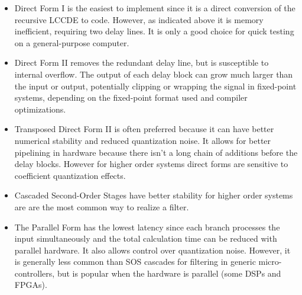 \documentclass{article}
\begin{document}
\begin{itemize}
\item Direct Form I is the easiest to implement since it is a direct conversion of the recursive LCCDE to code. However, as indicated above it is memory inefficient, requiring two delay lines. It is only a good choice for quick testing on a general-purpose computer.
\item Direct Form II removes the redundant delay line, but is susceptible to internal overflow. The output of each delay block can grow much larger than the input or output, potentially clipping or wrapping the signal in fixed-point systems, depending on the fixed-point format used and compiler optimizations.
\item Transposed Direct Form II is often preferred because it can have better numerical stability and reduced quantization noise. It allows for better pipelining in hardware because there isn't a long chain of additions before the delay blocks. However for higher order systems direct forms are sensitive to coefficient quantization effects.
\item Cascaded Second-Order Stages have better stability for higher order systems are are the most common way to realize a filter.
\item The Parallel Form has the lowest latency since each branch processes the input simultaneously and the total calculation time can be reduced with parallel hardware. It also allows control over quantization noise. However, it is generally less common than SOS cascades for filtering in generic micro-controllers, but is popular when the hardware is parallel (some DSPs and FPGAs).
\end{itemize}
\end{document}
